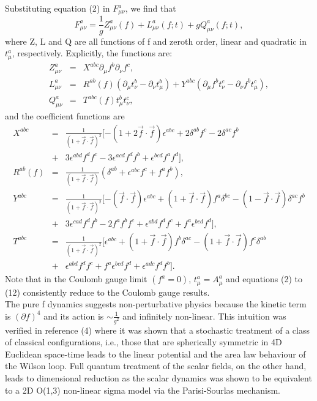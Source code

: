 \documentclass[a4paper,12pt]{article}
\begin{document}
Substituting equation (2) in $F^{a}_{\mu\nu}$, we find that
\begin{equation}\label{4}
F^{a}_{\mu\nu}=\frac{1}{g}Z^{a}_{\mu\nu}(f)+L^{a}_{\mu\nu}(f;t)+g Q^{a}_{\mu\nu}(f;t),
\end{equation}
where Z, L and Q are all functions of f and zeroth order, linear and quadratic in $t^{a}_{\mu}$, respectively.  Explicitly, the functions are:
\begin{eqnarray}\label{5}
Z^{a}_{\mu\nu}&=&X^{abc}\partial_{\mu}f^{b}\partial_{\nu}f^{c},\\
L^{a}_{\mu\nu}&=&R^{ab}(f)(\partial_{\mu}t^{b}_{\nu}-\partial_{\nu}t^{b}_{\mu})+Y^{abc}(\partial_{\mu}f^{b}t^{c}_{\nu}-\partial_{\nu}f^{b}t^{c}_{\mu}),\\
Q^{a}_{\mu\nu}&=&T^{abc}(f)t^{b}_{\mu}t^{c}_{\nu},
\end{eqnarray}
and the coefficient functions are
\begin{eqnarray}\label{6}
X^{abc}&=&\frac{1}{(1+\vec{f}\cdot\vec{f})^{2}}[-(1+2\vec{f}\cdot\vec{f})\epsilon^{abc}+2\delta^{ab}f^{c}-2\delta^{ac}f^{b}\nonumber\\
&+&3\epsilon^{abd}f^{d}f^{c}-3\epsilon^{acd}f^{d}f^{b}+\epsilon^{bcd}f^{a}f^{d}],\\
R^{ab}(f)&=&\frac{1}{(1+\vec{f}\cdot\vec{f})}(\delta^{ab}+\epsilon^{abc}f^{c}+f^{a}f^{b}),\\
Y^{abc}&=&\frac{1}{(1+\vec{f}\cdot\vec{f})^{2}}[-(\vec{f}\cdot\vec{f})\epsilon^{abc}+(1+\vec{f}\cdot\vec{f})f^{a}\delta^{bc}-(1-\vec{f}\cdot\vec{f})\delta^{ac}f^{b}\nonumber\\
&+&3\epsilon^{cad}f^{d}f^{b}-2f^{a}f^{b}f^{c}+\epsilon^{abd}f^{d}f^{c}+f^{a}\epsilon^{bcd}f^{d}],\\
T^{abc}&=&\frac{1}{(1+\vec{f}\cdot\vec{f})^{2}}[\epsilon^{abc}+(1+\vec{f}\cdot\vec{f})f^{b}\delta^{ac}-(1+\vec{f}\cdot\vec{f})f^{c}\delta^{ab}\nonumber\\
&+&\epsilon^{abd}f^{d}f^{c}+f^{a}\epsilon^{bcd}f^{d}+\epsilon^{adc}f^{d}f^{b}].
\end{eqnarray}
Note that in the Coulomb gauge limit $(f^{a}=0)$, $t^{a}_{\mu}=A^{a}_{\mu}$ and equations (2) to (12) consistently reduce to the Coulomb gauge results.\\

The pure f dynamics suggests non-perturbative physics because the kinetic term is $(\partial f)^{4}$ and its action is $\sim\frac{1}{g^{2}}$ and infinitely non-linear.  This intuition was verified in reference (4) where it was shown that a stochastic treatment of a class of classical configurations, i.e., those that are spherically symmetric in 4D Euclidean space-time leads to the linear potential and the area law behaviour of the Wilson loop.  Full quantum treatment of the scalar fields, on the other hand, leads to dimensional reduction as the scalar dynamics was shown to be equivalent to a 2D O(1,3) non-linear sigma model via the Parisi-Sourlas mechanism.\\
\end{document}
